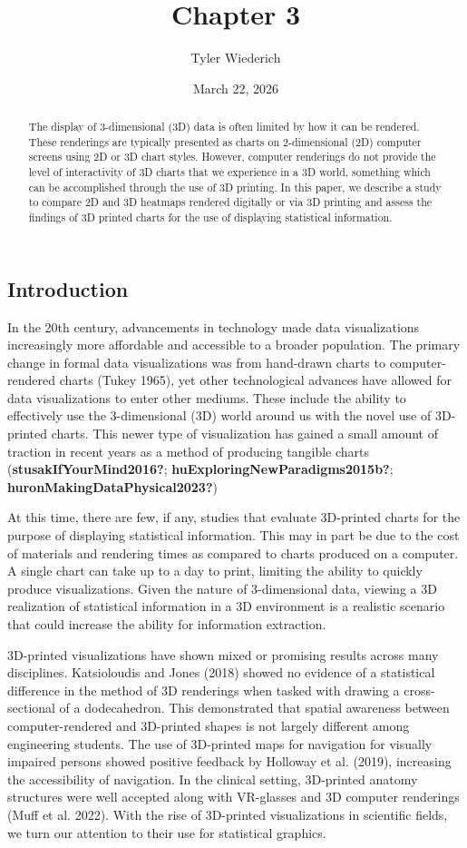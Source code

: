 \documentclass[
  letterpaper,
  DIV=11,
  numbers=noendperiod]{scrartcl}
\title{Chapter 3}
\author{Tyler Wiederich}
\date{March 22, 2026}
\begin{document}
\maketitle
\begin{abstract}
The display of 3-dimensional (3D) data is often limited by how it can be
rendered. These renderings are typically presented as charts on
2-dimensional (2D) computer screens using 2D or 3D chart styles.
However, computer renderings do not provide the level of interactivity
of 3D charts that we experience in a 3D world, something which can be
accomplished through the use of 3D printing. In this paper, we describe
a study to compare 2D and 3D heatmaps rendered digitally or via 3D
printing and assess the findings of 3D printed charts for the use of
displaying statistical information.
\end{abstract}


\subsection{Introduction}\label{introduction}

In the 20th century, advancements in technology made data visualizations
increasingly more affordable and accessible to a broader population. The
primary change in formal data visualizations was from hand-drawn charts
to computer-rendered charts (Tukey 1965), yet other technological
advances have allowed for data visualizations to enter other mediums.
These include the ability to effectively use the 3-dimensional (3D)
world around us with the novel use of 3D-printed charts. This newer type
of visualization has gained a small amount of traction in recent years
as a method of producing tangible charts
(\textbf{stusakIfYourMind2016?}; \textbf{huExploringNewParadigms2015b?};
\textbf{huronMakingDataPhysical2023?})

At this time, there are few, if any, studies that evaluate 3D-printed
charts for the purpose of displaying statistical information. This may
in part be due to the cost of materials and rendering times as compared
to charts produced on a computer. A single chart can take up to a day to
print, limiting the ability to quickly produce visualizations. Given the
nature of 3-dimensional data, viewing a 3D realization of statistical
information in a 3D environment is a realistic scenario that could
increase the ability for information extraction.

3D-printed visualizations have shown mixed or promising results across
many disciplines. Katsioloudis and Jones (2018) showed no evidence of a
statistical difference in the method of 3D renderings when tasked with
drawing a cross-sectional of a dodecahedron. This demonstrated that
spatial awareness between computer-rendered and 3D-printed shapes is not
largely different among engineering students. The use of 3D-printed maps
for navigation for visually impaired persons showed positive feedback by
Holloway et al. (2019), increasing the accessibility of navigation. In
the clinical setting, 3D-printed anatomy structures were well accepted
along with VR-glasses and 3D computer renderings (Muff et al. 2022).
With the rise of 3D-printed visualizations in scientific fields, we turn
our attention to their use for statistical graphics.
\end{document}
